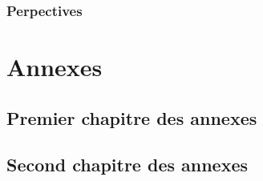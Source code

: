 \documentclass[french]{spimubphdthesis}
\begin{document}
\section{Perpectives}
 
\backmatter
 
 
 
 
 
 
 
 
 

%
 

 
 
\listoffigures
 
\listoftables
 
\listofdefinitions

\appendix
\part{Annexes}
 
\chapter{Premier chapitre des annexes}

\chapter{Second chapitre des annexes}
 
\end{document}
